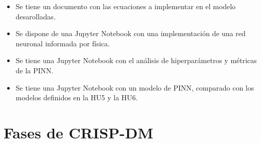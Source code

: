 \documentclass[
11pt, %
]{charter}
\begin{document}
\begin{itemize}
\begin{itemize}
        \begin{itemize}
          \item Se tiene un documento con las ecuaciones a implementar en el modelo desarolladas.
          \item Se dispone de una Jupyter Notebook con una implementación de una red neuronal informada por física.
          \item Se tiene una Jupyter Notebook con el análisis de hiperparámetros y métricas de la PINN.
          \item Se tiene una Jupyter Notebook con un modelo de PINN, comparado con los modelos definidos en la HU5 y la HU6.
        \end{itemize}
    \end{itemize}
\end{itemize}

\section{Fases de CRISP-DM}
\end{document}
